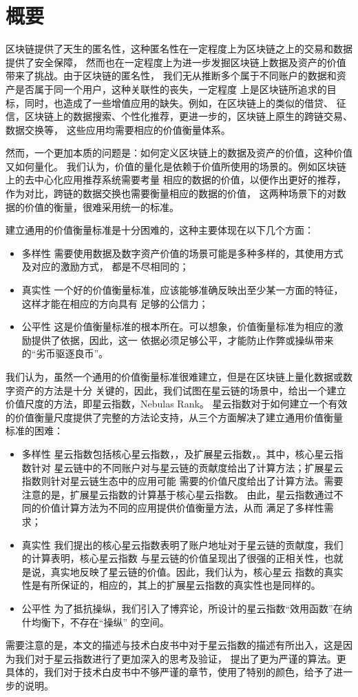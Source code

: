 \section{概要}

区块链提供了天生的匿名性，这种匿名性在一定程度上为区块链之上的交易和数据提供了安全保障，
然而也在一定程度上为进一步发掘区块链上数据及资产的价值带来了挑战。由于区块链的匿名性，
我们无从推断多个属于不同账户的数据和资产是否属于同一个用户，这种关联性的丧失，一定程度
上是区块链所追求的目标，同时，也造成了一些增值应用的缺失。例如，在区块链上的类似的借贷、
征信，区块链上的数据搜索、个性化推荐，更进一步的，区块链上原生的跨链交易、数据交换等，
这些应用均需要相应的价值衡量体系。

然而，一个更加本质的问题是：如何定义区块链上的数据及资产的价值，这种价值又如何量化。
我们认为，价值的量化是依赖于价值所使用的场景的。例如区块链上的去中心化应用推荐系统需要考量
相应的数据的价值，以便作出更好的推荐，作为对比，跨链的数据交换也需要衡量相应的数据的价值，
这两种场景下的对数据的价值的衡量，很难采用统一的标准。

建立通用的价值衡量标准是十分困难的，这种主要体现在以下几个方面：
\begin{itemize}
\item{多样性} 需要使用数据及数字资产价值的场景可能是多种多样的，其使用方式及对应的激励方式，
都是不尽相同的；
\item{真实性} 一个好的价值衡量标准，应该能够准确反映出至少某一方面的特征，这样才能在相应的方向具有
足够的公信力；
\item{公平性} 这是价值衡量标准的根本所在。可以想象，价值衡量标准为相应的激励提供了依据，因此，这一
依据必须足够公平，才能防止作弊或操纵带来的“劣币驱逐良币”。
\end{itemize}

我们认为，虽然一个通用的价值衡量标准很难建立，但是在区块链上量化数据或数字资产的方法是十分
关键的，因此，我们试图在星云链的场景中，给出一个建立价值尺度的方法，即星云指数，Nebulas Rank。
星云指数对于如何建立一个有效的价值衡量尺度提供了完整的方法论支持，从三个方面解决了建立通用价值衡量
标准的困难：
\begin{itemize}
\item{多样性} 星云指数包括核心星云指数，\nrcore，及扩展星云指数，\nrext。其中，核心星云指数针对
星云链中的不同账户对与星云链的贡献度给出了计算方法；扩展星云指数则针对星云链生态中的应用可能
需要的价值尺度给出了计算方法。需要注意的是，扩展星云指数的计算基于核心星云指数。
由此，星云指数通过不同的价值计算方法为不同的应用提供价值衡量方法，从而
满足了多样性需求；
\item{真实性} 我们提出的核心星云指数表明了账户地址对于星云链的贡献度，我们的计算表明，核心星云指数
与星云链的价值呈现出了很强的正相关性，也就是说，真实地反映了星云链的价值。因此，我们认为，核心星云
指数的真实性是有所保证的，相应的，其上的扩展星云指数的真实性也是同样的。
\item{公平性} {\color{blue} 为了抵抗操纵，我们引入了博弈论，所设计的星云指数“效用函数”在纳什均衡下，不存在“操纵”
的空间。}
\end{itemize}


需要注意的是，本文的描述与技术白皮书中对于星云指数的描述有所出入，这是因为我们对于星云指数进行了更加深入的思考及验证，
提出了更为严谨的算法。更具体的，我们对于技术白皮书中不够严谨的章节，使用了{\color{gray}特别的颜色}，给予了进一步的说明。
